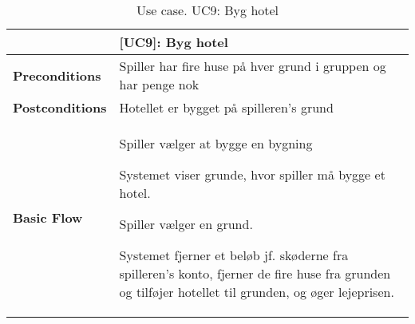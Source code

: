 \documentclass[class=article, crop=false]{standalone}
\begin{document}
    \begin{table}[H]
        \caption{Use case. UC9: Byg hotel}
        \begin{tabularx}{\textwidth}{|l|X|}
            \hline
            & \textbf{[UC9]: Byg hotel}   \\ \hline
            \textbf{Preconditions}       & Spiller har fire huse på hver grund i gruppen og har penge nok\\ \hline
            \textbf{Postconditions}      & Hotellet er bygget på spilleren's grund\\ \hline


            \textbf{Basic Flow} & \begin{tabenum}
                                      \item Spiller vælger at bygge en bygning
                                      \item Systemet viser grunde, hvor spiller må bygge et hotel.
                                      \item Spiller vælger en grund.
                                      \item Systemet fjerner et beløb jf. skøderne fra spilleren's konto, fjerner de fire huse fra grunden og tilføjer hotellet til grunden, og øger lejeprisen.
            \end{tabenum}   \\ \hline



        \end{tabularx}


    \end{table}
\end{document}
